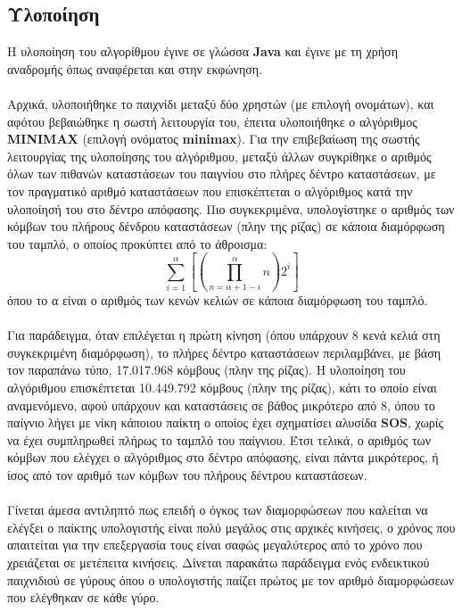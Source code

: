 \documentclass{article}
\begin{document}
\subsection*{Υλοποίηση}
Η υλοποίηση του αλγορίθμου έγινε σε γλώσσα \textbf{Java} και έγινε με τη χρήση αναδρομής όπως αναφέρεται και στην εκφώνηση.\\\\
Αρχικά, υλοποιήθηκε το
παιχνίδι μεταξύ δύο χρηστών (με επιλογή ονομάτων), και αφότου βεβαιώθηκε η σωστή λειτουργία του, έπειτα
υλοποιήθηκε ο αλγόριθμος \textbf{MINIMAX} (επιλογή ονόματος \textbf{minimax}). Για την επιβεβαίωση της σωστής λειτουργίας της υλοποίησης του αλγόριθμου, μεταξύ άλλων συγκρίθηκε ο αριθμός όλων των πιθανών καταστάσεων του παιγνίου στο πλήρες δέντρο καταστάσεων, με τον πραγματικό αριθμό καταστάσεων που επισκέπτεται ο αλγόριθμος κατά την υλοποίησή του στο δέντρο απόφασης. Πιο συγκεκριμένα, υπολογίστηκε ο αριθμός των κόμβων του πλήρους δένδρου καταστάσεων (πλην της ρίζας) σε κάποια διαμόρφωση του ταμπλό, ο οποίος προκύπτει από το άθροισμα: $$\sum_{i=1}^{α}\left[\left(\prod_{n=α+1-i}^{α}n\right)2^{i}\right]$$ όπου το α είναι ο αριθμός των κενών κελιών σε κάποια διαμόρφωση του ταμπλό.\\\\
Για παράδειγμα, όταν επιλέγεται η πρώτη κίνηση (όπου υπάρχουν 8 κενά κελιά στη συγκεκριμένη διαμόρφωση), το πλήρες δέντρο καταστάσεων περιλαμβάνει, με βάση τον παραπάνω τύπο, 17.017.968 κόμβους (πλην της ρίζας). Η υλοποίηση του αλγόριθμου επισκέπτεται 10.449.792 κόμβους (πλην της ρίζας), κάτι το οποίο είναι αναμενόμενο, αφού υπάρχουν και καταστάσεις σε βάθος μικρότερο από 8, όπου το παίγνιο λήγει με νίκη κάποιου παίκτη ο οποίος έχει σχηματίσει αλυσίδα \textbf{SOS}, χωρίς να έχει συμπληρωθεί πλήρως το ταμπλό του παίγνιου. Έτσι τελικά, ο αριθμός των κόμβων που ελέγχει ο αλγόριθμος στο δέντρο απόφασης, είναι πάντα μικρότερος, ή ίσος από τον αριθμό των κόμβων του πλήρους δέντρου καταστάσεων. \\\\
Γίνεται άμεσα αντιληπτό πως επειδή ο όγκος των διαμορφώσεων που καλείται να ελέγξει ο παίκτης υπολογιστής είναι πολύ μεγάλος στις αρχικές κινήσεις, ο χρόνος που απαιτείται για την επεξεργασία τους είναι σαφώς μεγαλύτερος από το χρόνο που χρειάζεται  σε μετέπειτα κινήσεις. Δίνεται παρακάτω παράδειγμα ενός ενδεικτικού παιχνιδιού σε γύρους όπου ο υπολογιστής παίζει πρώτος με τον αριθμό διαμορφώσεων που ελέγθηκαν σε κάθε γύρο.
\end{document}
